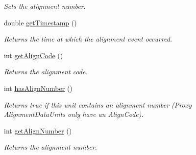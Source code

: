 \begin{DoxyCompactItemize}
\begin{DoxyCompactList}\small\item\em Sets the alignment number. \end{DoxyCompactList}\item 
\hypertarget{class_picto_1_1_alignment_data_unit_ab9011d84d2c3f58334a7ec8cdff29ea3}{double \hyperlink{class_picto_1_1_alignment_data_unit_ab9011d84d2c3f58334a7ec8cdff29ea3}{get\-Timestamp} ()}\label{class_picto_1_1_alignment_data_unit_ab9011d84d2c3f58334a7ec8cdff29ea3}

\begin{DoxyCompactList}\small\item\em Returns the time at which the alignment event occurred. \end{DoxyCompactList}\item 
\hypertarget{class_picto_1_1_alignment_data_unit_aa180570934d3bb3fe4fb228e03bdcbd9}{int \hyperlink{class_picto_1_1_alignment_data_unit_aa180570934d3bb3fe4fb228e03bdcbd9}{get\-Align\-Code} ()}\label{class_picto_1_1_alignment_data_unit_aa180570934d3bb3fe4fb228e03bdcbd9}

\begin{DoxyCompactList}\small\item\em Returns the alignment code. \end{DoxyCompactList}\item 
\hypertarget{class_picto_1_1_alignment_data_unit_af8f9da7d489ff6747f7da641160a1c5f}{int \hyperlink{class_picto_1_1_alignment_data_unit_af8f9da7d489ff6747f7da641160a1c5f}{has\-Align\-Number} ()}\label{class_picto_1_1_alignment_data_unit_af8f9da7d489ff6747f7da641160a1c5f}

\begin{DoxyCompactList}\small\item\em Returns true if this unit contains an alignment number (Proxy Alignment\-Data\-Units only have an Align\-Code). \end{DoxyCompactList}\item 
\hypertarget{class_picto_1_1_alignment_data_unit_a66015cf8ca93a8d7b2dc7f75d2272d41}{int \hyperlink{class_picto_1_1_alignment_data_unit_a66015cf8ca93a8d7b2dc7f75d2272d41}{get\-Align\-Number} ()}\label{class_picto_1_1_alignment_data_unit_a66015cf8ca93a8d7b2dc7f75d2272d41}

\begin{DoxyCompactList}\small\item\em Returns the alignment number. \end{DoxyCompactList}\end{DoxyCompactItemize}
